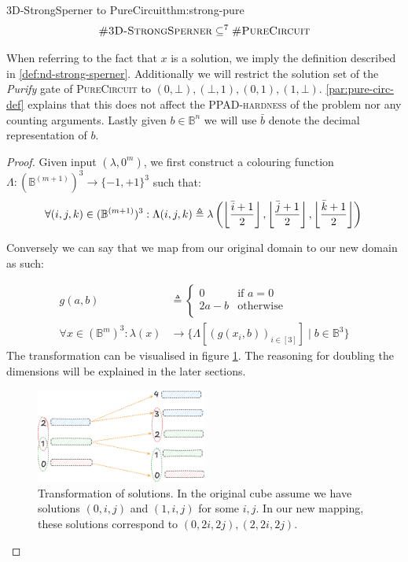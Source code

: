 \begin{theorembox}{3D-StrongSperner to PureCircuit}{thm:strong-pure}
    $$
    \textnormal{\textsc{\#3D-StrongSperner}} \subseteq^{7} \textnormal{\textsc{\#PureCircuit}}
    $$
\end{theorembox}

When referring to the fact that $x$ is a solution, we imply the definition described in  \ref{def:nd-strong-sperner}.
Additionally we will restrict the solution set of the \textit{Purify} gate of \textsc{PureCircuit}
to $(0,\bot),(\bot, 1), (0,1), (1, \bot)$. \ref{par:pure-circ-def} explains that this
does not affect the \textsc{PPAD-hardness} of the problem nor any counting arguments.
Lastly given $b \in \mathbb{B}^n$ we will use $\bar{b}$ denote the decimal representation of $b$.

\begin{proof} 
    Given input $(\lambda, 0^m)$, we first construct a colouring function $\Lambda: (\mathbb{B}^{(m+1)})^3 \to \{-1,+1\}^3$ such that:
$$
\forall (i,j,k) \in (\mathbb{B}^{(m+1)})^3: \Lambda(i,j,k) \triangleq 
\lambda\left( \left\lfloor  \frac{{\bar{i}+1}}{2}  \right\rfloor, \left\lfloor  \frac{{\bar{j}+1}}{2} \right\rfloor, \left\lfloor  \frac{{\bar{k}+1}}{2} \right\rfloor \right)  \\
$$

Conversely we can say that we map from our original domain to our new domain as such:

\begin{align}
    g(a, b) &\triangleq \begin{cases}
        0 &\text{if } a = 0 \\
        2a - b &\text{otherwise}\\
    \end{cases} \\
        \forall  x \in (\mathbb{B}^{m})^3: \lambda(x) &\to \{\Lambda[(g(x_i,b))_{i \in [3]}] \mid b \in \mathbb{B}^{3}\}
\label{eq:trans-eq}
\end{align}
The transformation can be visualised in figure \ref{fig:main-proof:set_mapping}.
The reasoning for doubling the dimensions will be explained in the later sections.

\begin{figure}[h!]
    \centering
    \includegraphics[width=0.5\textwidth]{assets/1751381227.png}
\caption{Transformation of solutions. In the original cube assume we have solutions $(0,i,j)$ and $(1,i,j)$ for some $i,j$. In our new mapping, these solutions correspond to
$(0,2i,2j), (2,2i,2j)$.}
    \label{fig:main-proof:set_mapping}
\end{figure}


\end{proof}
